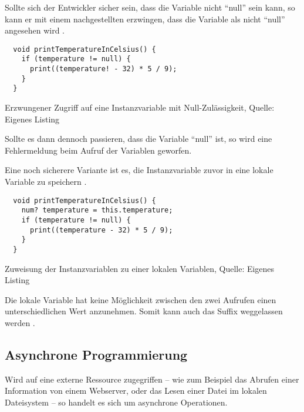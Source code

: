 Sollte sich der Entwickler sicher sein,
dass die Variable nicht \enquote{null} sein kann,
so kann er mit einem nachgestellten \IC{!} erzwingen,
dass die Variable als nicht \enquote{null} angesehen wird .

\ifIncludeFigures
  \begin{listing}[ht]
    \begin{verbatim}
  void printTemperatureInCelsius() {
    if (temperature != null) {
      print((temperature! - 32) * 5 / 9);
    }
  }
    \end{verbatim}
    \caption[Erzwungener Zugriff auf eine Instanzvariable mit Null-Zulässigkeit]{Erzwungener Zugriff auf eine Instanzvariable mit Null-Zulässigkeit, Quelle: Eigenes Listing}
    \label{lst:printTemperatureInCelsiusLocalVariableForceNullCheck}
  \end{listing}
\fi

Sollte es dann dennoch passieren, dass die Variable \enquote{null} ist, so wird eine Fehlermeldung beim Aufruf der Variablen geworfen.



Eine noch sicherere Variante ist es, die Instanzvariable zuvor in eine lokale Variable zu speichern .


\ifIncludeFigures
  \begin{listing}[ht]
    \begin{verbatim}
  void printTemperatureInCelsius() {
    num? temperature = this.temperature;
    if (temperature != null) {
      print((temperature - 32) * 5 / 9);
    }
  }
    \end{verbatim}
    \caption[Zuweisung der Instanzvariablen zu einer lokalen Variablen]{Zuweisung der Instanzvariablen zu einer lokalen Variablen, Quelle: Eigenes Listing}
    \label{lst:printTemperatureInCelsiusLocalVariable}
  \end{listing}
\fi

Die lokale Variable hat keine Möglichkeit zwischen den zwei Aufrufen einen unterschiedlichen Wert anzunehmen.
Somit kann auch das Suffix \IC{!} weggelassen werden .



\subsection{Asynchrone Programmierung}

Wird auf eine externe Ressource zugegriffen -- wie zum Beispiel das Abrufen einer Information von einem Webserver, oder das Lesen einer Datei im lokalen Dateisystem -- so handelt es sich um asynchrone Operationen.

